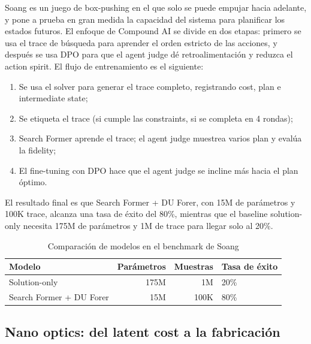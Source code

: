 \documentclass[a4paper]{article}
\begin{document}
Soang es un juego de box-pushing en el que solo se puede empujar hacia adelante, y pone a prueba en gran medida la capacidad del sistema para planificar los estados futuros. El enfoque de Compound AI se divide en dos etapas: primero se usa el trace de búsqueda para aprender el orden estricto de las acciones, y después se usa DPO para que el agent judge dé retroalimentación y reduzca el action spirit. El flujo de entrenamiento es el siguiente:
\begin{enumerate}
    \item Se usa el solver para generar el trace completo, registrando cost, plan e intermediate state;
    \item Se etiqueta el trace (si cumple las constraints, si se completa en 4 rondas);
    \item Search Former aprende el trace; el agent judge muestrea varios plan y evalúa la fidelity;
    \item El fine-tuning con DPO hace que el agent judge se incline más hacia el plan óptimo.
\end{enumerate}
El resultado final es que Search Former + DU Forer, con 15M de parámetros y 100K trace, alcanza una tasa de éxito del 80\%, mientras que el baseline solution-only necesita 175M de parámetros y 1M de trace para llegar solo al 20\%.
\begin{table}[H]
\centering
\begin{tabular}{lrrl}
\toprule
Modelo & Parámetros & Muestras & Tasa de éxito \\
\midrule
Solution-only & 175M & 1M & 20\% \\
Search Former + DU Forer & 15M & 100K & 80\% \\
\bottomrule
\end{tabular}
\caption{Comparación de modelos en el benchmark de Soang}
\end{table}

\subsection{Nano optics: del latent cost a la fabricación}
\end{document}
